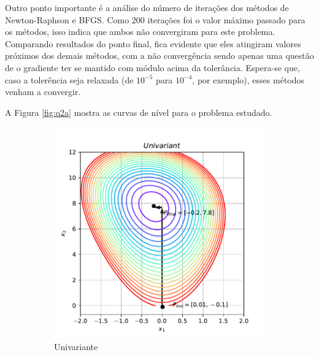 \documentclass[10pt, a4paper]{article}
\begin{document}
Outro ponto importante é a análise do número de iterações dos métodos de Newton-Raphson e BFGS. Como 200 iterações foi o valor máximo passado para os métodos,
isso indica que ambos não convergiram para este problema. Comparando resultados do ponto final, fica evidente que eles atingiram valores próximos dos demais métodos,
com a não convergência sendo apenas uma questão de o gradiente ter se mantido com módulo acima da tolerância. Espera-se que, caso a tolerência seja relaxada (de $10^{-5}$ para $10^{-4}$,
por exemplo), esses métodos venham a convergir.

A Figura \ref{fig:q2a} mostra as curvas de nível para o problema estudado.

\begin{figure}[htpb]
  \centering
  \begin{subfigure}[b]{0.32\textwidth}
      \centering
      \includegraphics[width=\textwidth]{images/q2a_Univariant.pdf}
      \caption{Univariante}
      \label{fig:q2a_univariant}
  \end{subfigure}
  \hfill
  \begin{subfigure}[b]{0.32\textwidth}
    \centering

\end{subfigure}
\end{figure}
\end{document}
